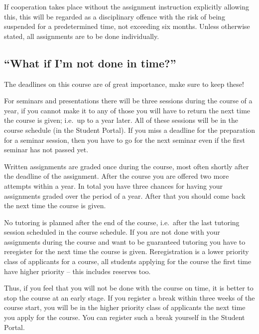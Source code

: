 If cooperation takes place without the assignment instruction explicitly 
allowing this, this will be regarded as a disciplinary offence with the risk of
being suspended for a predetermined time, not exceeding six months.
Unless otherwise stated, all assignments are to be done individually.

\subsection{\enquote{What if I'm not done in time?}}
\label{sec:late}
The deadlines on this course are of great importance, make sure to keep these!

For seminars and presentations there will be three sessions during the course 
of a year, if you cannot make it to any of those you will have to return the 
next time the course is given; i.e.~up to a year later.
All of these sessions will be in the course schedule (in the Student Portal).
If you miss a deadline for the preparation for a seminar session, then you have 
to go for the next seminar even if the first seminar has not passed yet.

Written assignments are graded once during the course, most often shortly after 
the deadline of the assignment.
After the course you are offered two more attempts within a year.
In total you have three chances for having your assignments graded over the 
period of a year.
After that you should come back the next time the course is given.

No tutoring is planned after the end of the course, i.e.~after the last 
tutoring session scheduled in the course schedule.
If you are not done with your assignments during the course and want to be 
guaranteed tutoring you have to reregister for the next time the course is 
given.
Reregistration is a lower priority class of applicants for a course, all 
students applying for the course the first time have higher priority -- this 
includes reserves too.


Thus, if you feel that you will not be done with the course on time, it is 
better to stop the course at an early stage.
If you register a break within three weeks of the course start, you will be in 
the higher priority class of applicants the next time you apply for the course.
You can register such a break yourself in the Student Portal.


\printbibliography{}
